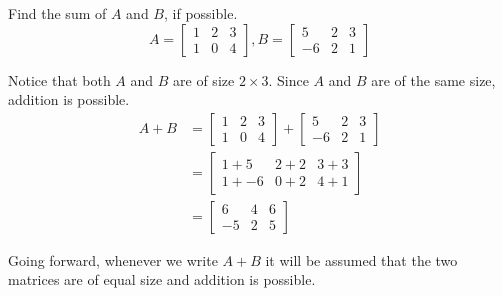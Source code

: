 \documentclass{ximera}
\begin{document}
\begin{example}\label{ex:samesizematrixaddition}
Find the sum of $A$ and $B$, if possible.
\begin{equation*}
A = \begin{bmatrix}
1 & 2 & 3 \\
1 & 0 & 4
\end{bmatrix},
B = \begin{bmatrix}
5 & 2 & 3 \\
-6 & 2 & 1
\end{bmatrix}
\end{equation*}
\begin{explanation}
Notice that both $A$ and $B$ are of size $2 \times 3$. 
Since $A$ and $B$ are of the same size, addition is possible. 
\begin{align*}
A + B &= \begin{bmatrix}
1 & 2 & 3 \\
1 & 0 & 4
\end{bmatrix}
+
\begin{bmatrix}
5 & 2 & 3 \\
-6 & 2 & 1
\end{bmatrix}\\
&=
\begin{bmatrix}
1+5 & 2+2 & 3+3 \\
1+ -6 & 0+2 & 4+1
\end{bmatrix}\\
&=
\begin{bmatrix}
6 & 4 & 6 \\
-5 & 2 & 5
\end{bmatrix}
\end{align*}
\end{explanation}
\end{example}

Going forward, whenever we write $A+B$ it will be assumed that the two matrices are of equal size and addition is possible.
\end{document}
